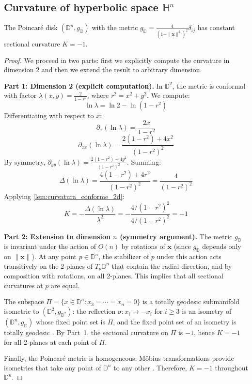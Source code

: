 \subsection{Curvature of hyperbolic space \texorpdfstring{$\mathbb{H}^n$}{Hn}}\label{subsec:curvatura_hiperbolico}

\begin{theorem}\label{thm:curvatura_hiperbolico}
The Poincaré disk $(\mathbb{D}^n, g_{\mathbb{D}})$ with the metric $g_{\mathbb{D}} = \frac{4}{(1-\|\mathbf{x}\|^2)^2}\delta_{ij}$ has constant sectional curvature $K = -1$.
\end{theorem}

\begin{proof}
We proceed in two parts: first we explicitly compute the curvature in dimension 2 and then we extend the result to arbitrary dimension.

\textbf{Part 1: Dimension 2 (explicit computation).}
In $\mathbb{D}^2$, the metric is conformal with factor $\lambda(x,y) = \frac{2}{1 - r^2}$, where $r^2 = x^2 + y^2$. We compute:
\[
\ln\lambda = \ln 2 - \ln(1 - r^2)
\]
Differentiating with respect to $x$:
\[
\partial_x(\ln\lambda) = \frac{2x}{1 - r^2}
\]
\[
\partial_{xx}(\ln\lambda) = \frac{2(1-r^2) + 4x^2}{(1-r^2)^2}
\]
By symmetry, $\partial_{yy}(\ln\lambda) = \frac{2(1-r^2) + 4y^2}{(1-r^2)^2}$. Summing:
\[
\Delta(\ln\lambda) = \frac{4(1-r^2) + 4r^2}{(1-r^2)^2} = \frac{4}{(1-r^2)^2}
\]
Applying \autoref{lem:curvatura_conforme_2d}:
\[
K = -\frac{\Delta(\ln\lambda)}{\lambda^2} = -\frac{4/(1-r^2)^2}{4/(1-r^2)^2} = -1
\]

\textbf{Part 2: Extension to dimension $n$ (symmetry argument).}
The metric $g_{\mathbb{D}}$ is invariant under the action of $O(n)$ by rotations of $\mathbf{x}$ (since $g_{\mathbb{D}}$ depends only on $\|\mathbf{x}\|$). At any point $p \in \mathbb{D}^n$, the stabilizer of $p$ under this action acts transitively on the 2-planes of $T_p\mathbb{D}^n$ that contain the radial direction, and by composition with rotations, on all 2-planes. This implies that all sectional curvatures at $p$ are equal.

The subspace $\Pi = \{x \in \mathbb{D}^n : x_3 = \cdots = x_n = 0\}$ is a totally geodesic submanifold isometric to $(\mathbb{D}^2, g_{\mathbb{D}^2})$: the reflection $\sigma: x_i \mapsto -x_i$ for $i \geq 3$ is an isometry of $(\mathbb{D}^n, g_{\mathbb{D}})$ whose fixed point set is $\Pi$, and the fixed point set of an isometry is totally geodesic \citep[Proposition~5.21]{lee2018introduction}. By Part~1, the sectional curvature on $\Pi$ is $-1$, hence $K = -1$ for all 2-planes at each point of $\Pi$.

Finally, the Poincaré metric is homogeneous: Möbius transformations provide isometries that take any point of $\mathbb{D}^n$ to any other \citep{nickel2017poincare}. Therefore, $K = -1$ throughout $\mathbb{D}^n$.
\end{proof}


